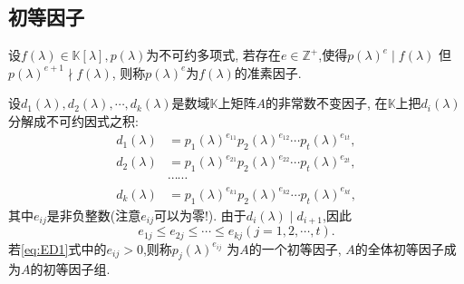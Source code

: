 \subsection{初等因子}
\begin{definition}
  设$f(\lambda)\in \mathbb{K}[\lambda], p(\lambda)$为不可约多项式,
  若存在$e\in \mathbb{Z}^+$,使得$p(\lambda)^e\mid f(\lambda)$
  但$p(\lambda)^{e+1}\nmid f(\lambda)$,
  则称$p(\lambda)^e$为$f(\lambda)$的准素因子.
\end{definition}
\begin{definition}
  设$d_1(\lambda),d_2(\lambda),\cdots,d_k(\lambda)$是数域$\mathbb{K}$上矩阵$A$的非常数不变因子,
  在$\mathbb{K}$上把$d_i(\lambda)$分解成不可约因式之积:
  \begin{equation}\label{eq:ED1}
    \begin{split}
      d_1(\lambda) & = p_1(\lambda)^{e_{11}}p_2(\lambda)^{e_{12}}\cdots p_t(\lambda)^{e_{1t}},\\
      d_2(\lambda) & = p_1(\lambda)^{e_{21}}p_2(\lambda)^{e_{22}}\cdots p_t(\lambda)^{e_{2t}},\\
      & \cdots\cdots\\
      d_k(\lambda) & = p_1(\lambda)^{e_{k1}}p_2(\lambda)^{e_{k2}}\cdots p_t(\lambda)^{e_{kt}},
    \end{split}
  \end{equation}
  其中$e_{ij}$是非负整数(注意$e_{ij}$可以为零!).
  由于$d_i(\lambda)\mid d_{i+1}$,因此
  \[e_{1j}\leq e_{2j}\leq \cdots\leq e_{kj}(j=1,2,\cdots,t).\]
  若\eqref{eq:ED1}式中的$e_{ij}>0$,则称$p_j(\lambda)^{e_{ij}}$
  为$A$的一个{\heiti 初等因子}, $A$的全体初等因子成为$A$的{\heiti 初等因子组}.


\end{definition}
